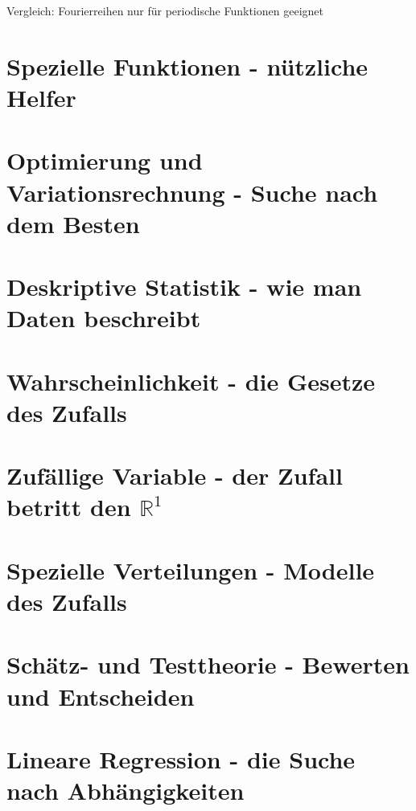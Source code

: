 \documentclass[a4paper]{article}
\begin{document}
Vergleich: Fourierreihen nur für periodische Funktionen geeignet

\newpage
\section{Spezielle Funktionen - nützliche Helfer}

\section{Optimierung und Variationsrechnung - Suche nach dem Besten}

\section{Deskriptive Statistik - wie man Daten beschreibt}

\section{Wahrscheinlichkeit - die Gesetze des Zufalls}

\section{Zufällige Variable - der Zufall betritt den $\mathbb{R}^1$}

\section{Spezielle Verteilungen - Modelle des Zufalls}

\section{Schätz- und Testtheorie - Bewerten und Entscheiden}

\section{Lineare Regression - die Suche nach Abhängigkeiten}
\end{document}

